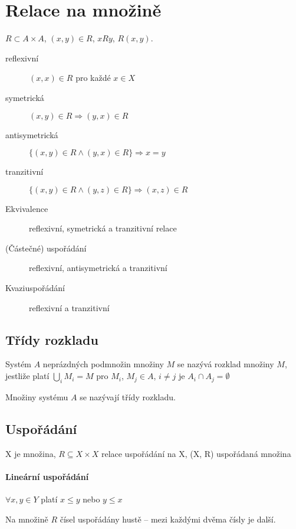 \documentclass[a4paper, 11pt]{report}
\begin{document}
\section{Relace na množině}

$R \subset A \times A$, $(x,y) \in R$, $xRy$, $R(x,y)$.

\begin{description}
	\item[reflexivní] $(x,x) \in R$ pro každé $x \in X$
	\item[symetrická] $(x,y) \in R \Rightarrow (y,x) \in R$
	\item[antisymetrická] $\{(x,y) \in R \land (y,x) \in R\} \Rightarrow x = y$
	\item[tranzitivní] $\{(x,y) \in R \land (y,z) \in R\} \Rightarrow (x,z) \in R$
\end{description}

\begin{description}
	\item[Ekvivalence] reflexivní, symetrická a tranzitivní relace
	\item[(Částečné) uspořádání] reflexivní, antisymetrická a tranzitivní
	\item[Kvaziuspořádání] reflexivní a tranzitivní
\end{description}

\subsection{Třídy rozkladu}

Systém $A$ neprázdných podmnožin množiny $M$ se nazývá rozklad množiny $M$, jestliže platí $\bigcup_i M_i = M$ pro $M_i$, $M_j \in A$, $i \neq j$ je $A_i \cap A_j = \emptyset$

Množiny systému $A$ se nazývají třídy rozkladu.

\subsection{Uspořádání}

X je množina, $R \subseteq X \times X$ relace uspořádání na X, (X, R) uspořádaná množina

\paragraph{Lineární uspořádání}

$\forall x,y \in Y$ platí $x \leq y$ nebo $y \leq x$

Na množině $R$ čísel uspořádány hustě -- mezi každými dvěma čísly je další.
\end{document}
